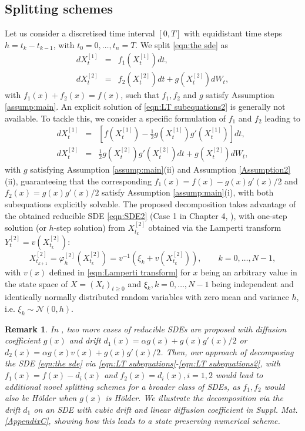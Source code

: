 \documentclass[a4paper,12pt]{article}
\numberwithin{equation}{section}
\theoremstyle{plain}
\newtheorem{remark}{Remark}
\theoremstyle{definition}
\begin{document}
\subsection{Splitting schemes}\label{sec:splittings}
Let us consider a discretised time interval $[0,T]$ with equidistant time steps $h=t_k-t_{k-1}$, with $t_0=0, \ldots, t_n = T$. We split \eqref{eqn:the sde} as 
\begin{eqnarray}\label{eqn:LT subequations}
dX^{[1]}_t&=&f_1(X^{[1]}_t)dt,\\
   \label{eqn:LT subequations2}dX^{[2]}_t&=&f_2(X^{[2]}_t)dt+g(X^{[2]}_t)dW_t,
\end{eqnarray}
with $f_1(x)+f_2(x)=f(x)$, 
such that $f_1, f_2$ and $g$ satisfy Assumption \ref{assump:main}. An explicit solution of \eqref{eqn:LT subequations2} is generally not available. To tackle this, we consider a specific formulation of $f_1$ and $f_2$ leading to
\begin{eqnarray}
\label{eqn:ODE1}
dX_t^{[1]}&=&
\left[f(X_t^{[1]})-\frac{1}{2}g(X_t^{[1]})g'(X_t^{[1]})\right]dt,
\\
\label{eqn:SDE2}
dX_t^{[2]}&=&
\frac{1}{2}g(X_t^{[2]})g'(X_t^{[2]})dt + g(X_t^{[2]})dW_t,
\end{eqnarray}
with $g$ satisfying Assumption \ref{assump:main}(ii) and Assumption \ref{Assumption2}(ii), guaranteeing that the  corresponding $f_1(x)=f(x)-g(x)g'(x)/2$ and $f_2(x)= g(x)g'(x)/2$ satisfy Assumption \ref{assump:main}(i), with both subequations explicitly solvable.  
The proposed decomposition takes advantage of the obtained reducible SDE \eqref{eqn:SDE2} (Case 1 in Chapter 4, \cite{kloeden_numerical_1992}), with one-step solution (or $h$-step solution) from $X^{[2]}_{t_k}$ obtained via the Lamperti transform \cite{lamperti_semi-stable_1972} $Y^{[2]}_t=v(X_{t_k}^{[2]})$:
\begin{equation}\label{solSDE2}
X_{t_{k+1}}^{[2]}=\varphi_h^{[2]}(X_{t_k}^{[2]})=v^{-1}(\xi_k+v(X_{t_k}^{[2]})),\qquad k=0,\ldots, N-1,
\end{equation}
with $v(x)$ defined in \eqref{eqn:Lamperti transform} for $x$ being an arbitrary value in the state space of $X=(X_t)_{t\geq 0}$ and $\xi_k, k=0,\ldots, N-1$ being independent and identically normally distributed random variables with zero mean  and variance $h$, i.e. $\xi_k\sim \mathcal{N}(0,h)$.
\begin{remark}\label{case2}
In \cite[Chapter 4]{kloeden_numerical_1992}, two more cases of reducible SDEs are proposed with diffusion coefficient $g(x)$ and drift $d_1(x)=\alpha g(x)+g(x)g'(x)/2$ or $d_2(x)=\alpha g(x)v(x)+g(x)g'(x)/2$. Then, our approach of decomposing the SDE \eqref{eqn:the sde} via \eqref{eqn:LT subequations}-\eqref{eqn:LT subequations2}, with $f_1(x)=f(x)-d_i(x)$ and $f_2(x)=d_i(x), i=1,2$ would lead to additional novel splitting schemes for a broader class of SDEs, as $f_1, f_2$ would also be H\"older when $g(x)$ is H\"older. We illustrate the decomposition via the drift $d_1$ on an SDE with cubic drift and linear diffusion coefficient in Suppl. Mat. \ref{AppendixC}, showing how this leads to a state preserving numerical scheme.
\end{remark}
\end{document}
